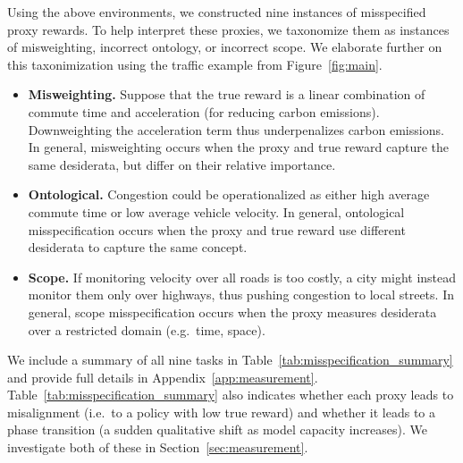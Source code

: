 Using the above environments, we constructed nine instances of misspecified proxy rewards. To help interpret these proxies, 
we taxonomize them as instances of misweighting, incorrect ontology, or incorrect scope. We elaborate further on this taxonimization using the traffic example from Figure~\ref{fig:main}. 
%
\begin{itemize}[leftmargin=*]
    \item \textbf{Misweighting.} Suppose that the true reward is a linear combination of commute time and acceleration (for reducing carbon emissions). Downweighting the acceleration term thus underpenalizes carbon emissions. In general, misweighting occurs when the proxy and true reward capture the same desiderata, but differ on their relative importance.
    \item \textbf{Ontological.} Congestion could be operationalized as either high average commute time or low average vehicle velocity. In general, ontological misspecification occurs when the proxy and true reward use different desiderata to capture the same concept. 
    \item \textbf{Scope.} If monitoring velocity over all roads is too costly, a city might instead monitor them only over highways, thus pushing congestion to local streets. In general, scope misspecification occurs when the proxy measures desiderata over a restricted domain (e.g.~time, space).  %
\end{itemize}
We include a summary of all nine tasks in  Table~\ref{tab:misspecification_summary} and provide full details in Appendix~\ref{app:measurement}. Table~\ref{tab:misspecification_summary} also indicates whether each proxy leads to misalignment (i.e.~to a policy with low true reward) and whether it leads to a phase transition (a sudden qualitative shift as model capacity increases). We investigate both of these in Section~\ref{sec:measurement}. %

